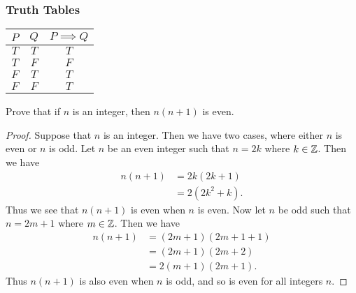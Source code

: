 \documentclass[class=article, crop=false]{standalone}
\begin{document}
  \subsubsection{Truth Tables}
  \begin{center}\begin{tabular}{c|c|c}
    $P$ & $Q$ & $P\implies Q$ \\
    \hline
    $T$ & $T$ & $T$ \\
    $T$ & $F$ & $F$ \\
    $F$ & $T$ & $T$ \\
    $F$ & $F$ & $T$
  \end{tabular}\end{center}
  \begin{example}{}
    Prove that if $n$ is an integer, then $n(n + 1)$ is even.
    \begin{proof}
      Suppose that $n$ is an integer. Then we have two cases, where either $n$ is even or $n$ is odd. Let $n$ be an even integer such that $n = 2k$ where $k\in \mathbb{Z}$. Then we have
      \begin{align*}
        n(n + 1) &= 2k(2k + 1) \\
                 &= 2(2k^2 + k).
      \end{align*}
      Thus we see that $n(n + 1)$ is even when $n$ is even. Now let $n$ be odd such that $n = 2m + 1$ where $m\in \mathbb{Z}$. Then we have
      \begin{align*}
        n(n + 1) &= (2m + 1)(2m + 1 + 1) \\
                 &= (2m + 1)(2m + 2) \\
                 &= 2(m + 1)(2m + 1).
      \end{align*}
      Thus $n(n + 1)$ is also even when $n$ is odd, and so is even for all integers $n$.
    \end{proof}
  \end{example}
\end{document}

